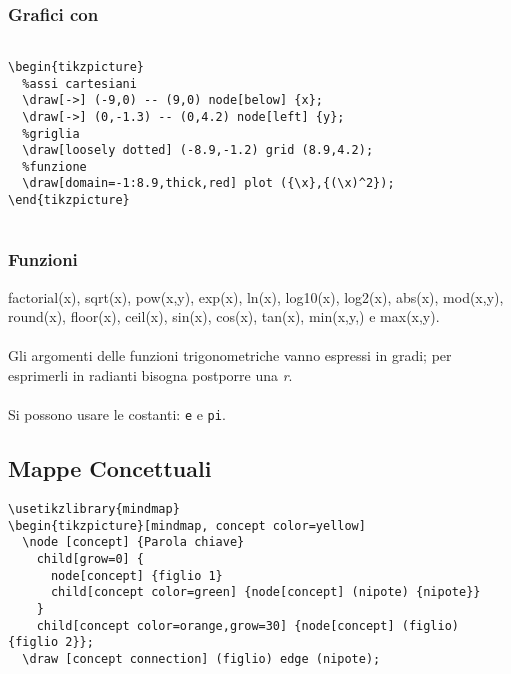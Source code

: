 \subsubsection{Grafici con \Tikz}
  \begin{flushleft}
    \texttt{~\\
    \textbackslash{}begin\{tikzpicture\}\\
    ~~\%assi cartesiani\\
    ~~\textbackslash{}draw[-\textgreater{}] (-9,0) -\hspace{0.01mm}- (9,0) node[below] \{\textdollar{}x\textdollar{}\};
\\
    ~~\textbackslash{}draw[-\textgreater{}] (0,-1.3) -\hspace{0.01mm}- (0,4.2) node[left] \{\textdollar{}y\textdollar{}\};\\
    ~~\%griglia\\
    ~~\textbackslash{}draw[loosely dotted] (-8.9,-1.2) grid (8.9,4.2);\\
    ~~\%funzione
\\
    ~~\textbackslash{}draw[domain=-1:8.9,thick,red] plot (\{\textbackslash{}x\},\{(\textbackslash{}x)\^{}2\});
\\
    \textbackslash{}end\{tikzpicture\}\\~
    }
    \end{flushleft}
\subsubsection{Funzioni}
 factorial(x), sqrt(x), pow(x,y), exp(x), ln(x), log10(x), log2(x), abs(x), mod(x,y), round(x), floor(x), ceil(x), sin(x), cos(x), tan(x), min(x,y,) e max(x,y).\\~\\
 Gli argomenti delle funzioni trigonometriche vanno espressi in gradi; per esprimerli in radianti bisogna postporre una \emph{r}.\\~\\
 Si possono usare le costanti: \texttt{e} e \texttt{pi}.

\subsection{Mappe Concettuali}
  \texttt{\textbackslash{}usetikzlibrary\{mindmap\}}\\
        \texttt{\textbackslash{}begin\{tikzpicture\}[mindmap, concept color=yellow]\\
~~\textbackslash{}node [concept] \{Parola chiave\}\\
~~~~child[grow=0] \{\\
~~~~~~node[concept] \{figlio 1\}\\
~~~~~~child[concept color=green] \{node[concept] (nipote) \{nipote\}\}\\
~~~~\}\\
~~~~child[concept color=orange,grow=30] \{node[concept] (figlio) \{figlio 2\}\};\\
~~\textbackslash{}draw [concept connection]  (figlio) edge (nipote);
}\\

